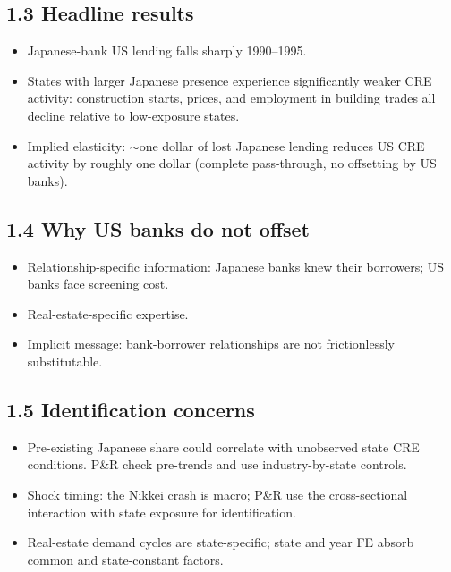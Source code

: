 \documentclass[11pt]{article}
\begin{document}
\subsection*{1.3 Headline results}
\begin{itemize}
\item Japanese-bank US lending falls sharply 1990--1995.
\item States with larger Japanese presence experience significantly weaker CRE activity: construction starts, prices, and employment in building trades all decline relative to low-exposure states.
\item Implied elasticity: $\sim$one dollar of lost Japanese lending reduces US CRE activity by roughly one dollar (complete pass-through, no offsetting by US banks).
\end{itemize}

\subsection*{1.4 Why US banks do not offset}
\begin{itemize}
\item Relationship-specific information: Japanese banks knew their borrowers; US banks face screening cost.
\item Real-estate-specific expertise.
\item Implicit message: bank-borrower relationships are not frictionlessly substitutable.
\end{itemize}

\subsection*{1.5 Identification concerns}
\begin{alertbox}
\begin{itemize}
\item Pre-existing Japanese share could correlate with unobserved state CRE conditions. P\&R check pre-trends and use industry-by-state controls.
\item Shock timing: the Nikkei crash is macro; P\&R use the cross-sectional interaction with state exposure for identification.
\item Real-estate demand cycles are state-specific; state and year FE absorb common and state-constant factors.
\end{itemize}
\end{alertbox}
\end{document}

